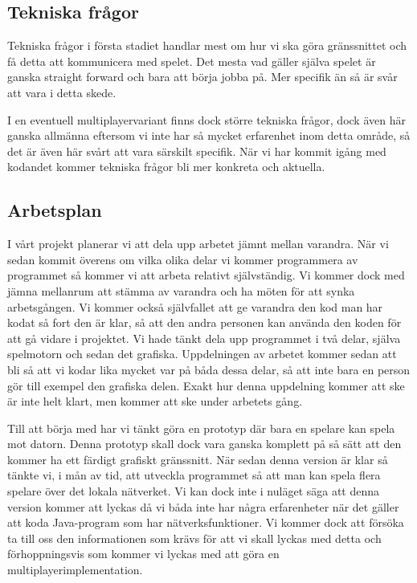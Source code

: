 \documentclass[10pt,a4paper]{article}
\begin{document}
\subsection*{Tekniska frågor}

Tekniska frågor i första stadiet handlar mest om hur vi ska göra
gränssnittet och få detta att kommunicera med spelet. Det mesta vad gäller
själva spelet är ganska straight forward och bara att börja jobba på. Mer
specifik än så är svår att vara i detta skede.

I en eventuell multiplayervariant finns dock större tekniska frågor, dock
även här ganska allmänna eftersom vi inte har så mycket erfarenhet inom
detta område, så det är även här svårt att vara särskilt specifik. När vi
har kommit igång med kodandet kommer tekniska frågor bli mer konkreta och
aktuella.

\subsection*{Arbetsplan}

I vårt projekt planerar vi att dela upp arbetet jämnt mellan varandra. När
vi sedan kommit överens om vilka olika delar vi kommer programmera av
programmet så kommer vi att arbeta relativt självständig. Vi kommer dock
med jämna mellanrum att stämma av varandra och ha möten för att synka
arbetsgången. Vi kommer också självfallet att ge varandra den kod man har
kodat så fort den är klar, så att den andra personen kan använda den koden
för att gå vidare i projektet. Vi hade tänkt dela upp programmet i två
delar, själva spelmotorn och sedan det grafiska. Uppdelningen av arbetet
kommer sedan att bli så att vi kodar lika mycket var på båda dessa delar,
så att inte bara en person gör till exempel den grafiska delen. Exakt hur
denna uppdelning kommer att ske är inte helt klart, men kommer att ske
under arbetets gång.

Till att börja med har vi tänkt göra en prototyp där bara en spelare kan
spela mot datorn. Denna prototyp skall dock vara ganska komplett på så sätt
att den kommer ha ett färdigt grafiskt gränssnitt. När sedan denna version
är klar så tänkte vi, i mån av tid, att utveckla programmet så att man kan
spela flera spelare över det lokala nätverket. Vi kan dock inte i nuläget
säga att denna version kommer att lyckas då vi båda inte har några
erfarenheter när det gäller att koda Java-program som har
nätverksfunktioner. Vi kommer dock att försöka ta till oss den
informationen som krävs för att vi skall lyckas med detta och
förhoppningsvis som kommer vi lyckas med att göra en
multiplayerimplementation.
\end{document}

